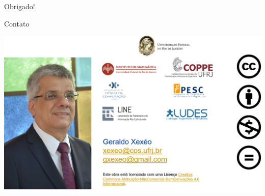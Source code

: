 \documentclass{beamer}
\begin{document}
\begin{frame}
\Huge \center
Obrigado!
\end{frame} 

\begin{frame}{Contato}
\begin{center}
    \includegraphics[width=\linewidth]{Images/Picture5.png}
\end{center}   
\end{frame}
\end{document}
